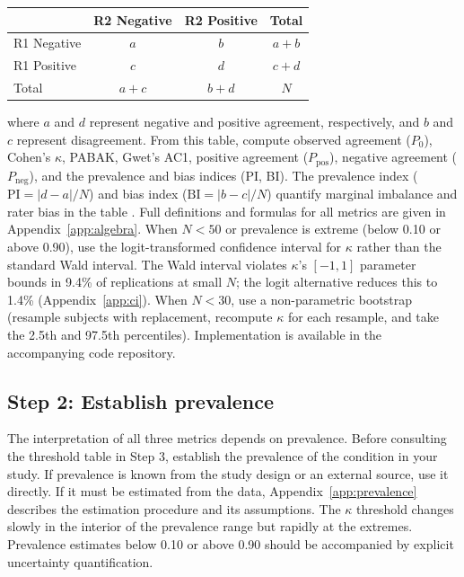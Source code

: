 \documentclass[11pt]{article}
\begin{document}
\begin{table}[h!]
\centering
\begin{tabular}{lcc||c}
\toprule
 & R2 Negative & R2 Positive & Total \\
\midrule
R1 Negative & $a$ & $b$ & $a + b$ \\
R1 Positive & $c$ & $d$ & $c + d$ \\
\midrule\midrule
Total & $a + c$ & $b + d$ & $N$ \\
\bottomrule
\end{tabular}
\end{table}

\noindent where $a$ and $d$ represent negative and positive agreement, respectively, and $b$ and $c$ represent disagreement. From this table, compute observed agreement ($P_0$), Cohen's $\kappa$, PABAK, Gwet's AC1, positive agreement ($P_{\text{pos}}$), negative agreement ($P_{\text{neg}}$), and the prevalence and bias indices (PI, BI). The prevalence index (\mbox{$\text{PI} = |d - a|/N$}) and bias index (\mbox{$\text{BI} = |b - c|/N$}) quantify marginal imbalance and rater bias in the table \citep{byrt1993bias}. Full definitions and formulas for all metrics are given in Appendix~\ref{app:algebra}. When $N < 50$ or prevalence is extreme (below 0.10 or above 0.90), use the logit-transformed confidence interval for $\kappa$ rather than the standard Wald interval. The Wald interval violates $\kappa$'s $[-1,1]$ parameter bounds in 9.4\% of replications at small $N$; the logit alternative reduces this to 1.4\% (Appendix~\ref{app:ci}). When $N < 30$, use a non-parametric bootstrap (resample subjects with replacement, recompute $\kappa$ for each resample, and take the 2.5th and 97.5th percentiles). Implementation is available in the accompanying code repository.

\subsection*{Step 2: Establish prevalence}

The interpretation of all three metrics depends on prevalence. Before consulting the threshold table in Step 3, establish the prevalence of the condition in your study. If prevalence is known from the study design or an external source, use it directly. If it must be estimated from the data, Appendix~\ref{app:prevalence} describes the estimation procedure and its assumptions. The $\kappa$ threshold changes slowly in the interior of the prevalence range but rapidly at the extremes. Prevalence estimates below 0.10 or above 0.90 should be accompanied by explicit uncertainty quantification.
\end{document}
